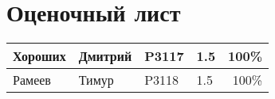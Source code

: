 \documentclass[12pt, a4paper]{article}
\begin{document}
\section{Оценочный лист}
\begin{center}
\large
\begin{tabular}{|l|l|l|l|r|}
\hline
Хороших & Дмитрий & P3117 & 1.5 & 100\%\\
\hline
Рамеев & Тимур & P3118 & 1.5  & 100\%\\
\hline
\end{tabular}
\end{center}
\end{document}
